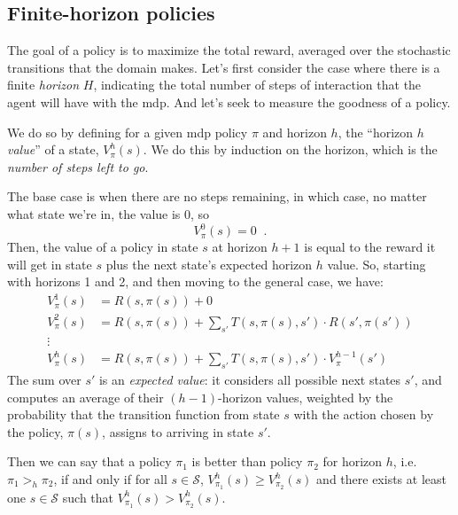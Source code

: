\subsection{Finite-horizon policies}
\label{sec:mdp_finite_horizon}

The goal of a policy is to maximize the total reward, averaged over
the stochastic transitions that the domain makes.  Let's first
consider the case where there is a finite {\em horizon} $H$,
indicating the total number of steps of interaction that the agent
will have with the {\sc mdp}.  And let's seek to measure the goodness of a
policy.

We do so by defining for a given {\sc mdp} policy $\pi$ and horizon
$h$, the ``horizon $h$ {\em value}'' of a state, $V^{h}_\pi(s)$.  We
do this by induction on the horizon, which is the {\em number of steps
  left to go}.

The base case is when there are no steps remaining, in which case, no
matter what state we're in, the value is 0,  so
\begin{equation*}
V^0_{\pi}(s) = 0\;\;.
\end{equation*}
Then, the value of a policy in state $s$ at horizon $h + 1$ is equal
to the reward it will get in state $s$ plus the next state's expected horizon $h$
value.  So, starting with horizons 1 and 2, and then
moving to the general case, we have:
\begin{align}
V^1_{\pi}(s) &= R(s, \pi(s)) + 0\\
V^2_{\pi}(s) &= R(s, \pi(s)) + \sum_{s'}T(s, \pi(s), s') \cdot R(s', \pi(s'))\\
\vdots\\
V^h_{\pi}(s) &= R(s, \pi(s)) + \sum_{s'}T(s, \pi(s), s') \cdot V^{h - 1}_{\pi}(s')
\label{eq:finite_value}
\end{align}
The sum over $s'$ is an {\em expected value}:  it considers all
possible next states $s'$, and computes an average of their
$(h-1)$-horizon values, weighted by the probability that the transition
function from state $s$ with the action chosen by the policy,
$\pi(s)$, assigns to arriving in state $s'$.

Then we can say that a policy $\pi_1$ is better than policy $\pi_2$ for horizon
$h$, i.e. $\pi_1 >_h \pi_2$, if and only if for all $s \in \mathcal S$,
$V_{\pi_1}^h(s) \geq V_{\pi_2}^h(s)$ and there exists at least one $s
\in \mathcal S$ such that $V_{\pi_1}^h(s) > V_{\pi_2}^h(s)$.

